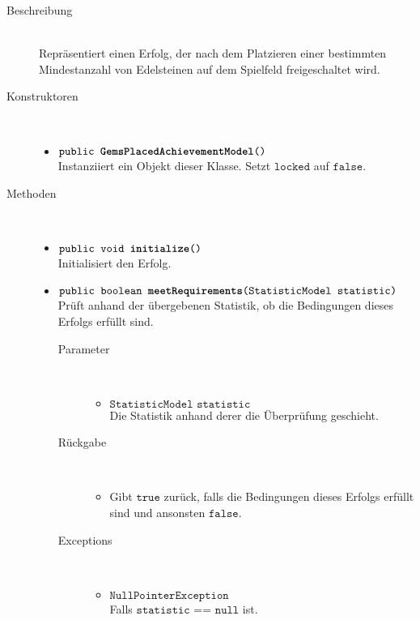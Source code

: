 \begin{description}
\item[Beschreibung] \hfill \\ Repräsentiert einen Erfolg, der nach dem Platzieren einer bestimmten Mindestanzahl von Edelsteinen auf dem Spielfeld freigeschaltet wird.
	
\item[Konstruktoren] \hfill \\
	\vspace{-.8cm}
	\begin{itemize}
		\item $\texttt{public \textbf{GemsPlacedAchievementModel}()}$ \\ Instanziiert ein Objekt dieser Klasse. Setzt $\texttt{locked}$ auf $\texttt{false}$.
	\end{itemize}
	
\item[Methoden] \hfill \\
	\vspace{-.8cm}
	\begin{itemize}
				\item $\texttt{public void \textbf{initialize}()}$ \\ Initialisiert den Erfolg.
		
		\item $\texttt{public boolean \textbf{meetRequirements}(StatisticModel statistic)}$ \\ Prüft anhand der übergebenen Statistik, ob die Bedingungen dieses Erfolgs erfüllt sind.
		\begin{description}
		\item[Parameter] \hfill \\
			\vspace{-.8cm}
			\begin{itemize}
				\item $\texttt{StatisticModel statistic}$ \\ Die Statistik anhand derer die Überprüfung geschieht. 
			\end{itemize}
			\item[Rückgabe] \hfill \\
			\vspace{-.8cm}
			\begin{itemize}
				\item Gibt $\texttt{true}$ zurück, falls die Bedingungen dieses Erfolgs erfüllt sind und ansonsten $\texttt{false}$.
			\end{itemize}
			\item[Exceptions] \hfill \\
			\vspace{-.8cm}
			\begin{itemize}
				\item $\texttt{NullPointerException}$ \\ Falls $\texttt{statistic == null}$ ist.
			\end{itemize}
		\end{description}
		
	\end{itemize}
\end{description}

